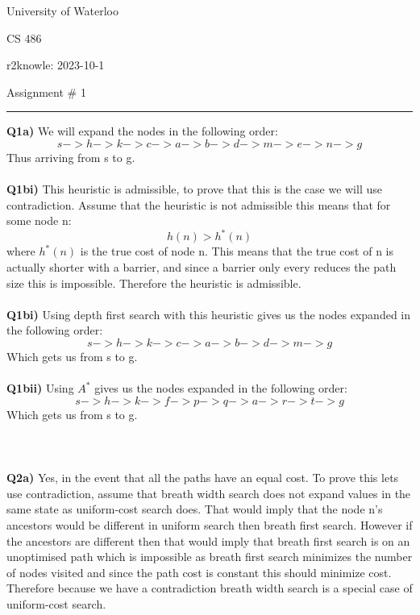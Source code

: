 \documentclass{article}
\begin{document}
\begin{titlepage}
	\setlength{\parindent}{0pt}
	\large

\vspace*{-2cm}


University of Waterloo \par
CS 486 \par
\vspace{0.05cm}
r2knowle: 2023-10-1
\vspace{0.2cm}

{\huge Assignment \# 1 \par}
\hrule

\vspace{0.5cm}
\textbf{Q1a)} We will expand the nodes in the following order:
\[ s -> h -> k -> c -> a -> b -> d -> m -> e -> n -> g \]
Thus arriving from s to g.\\\\
\textbf{Q1bi)} This heuristic is admissible, to prove that this is the case we will use contradiction. Assume that the heuristic is not admissible this means that for some node n:
\[ h(n) > h^*(n) \]
where $h^*(n)$ is the true cost of node n. This means that the true cost of n is actually shorter with a barrier, and since a barrier only every reduces the path size this is impossible. Therefore the heuristic is admissible. \\\\
\textbf{Q1bi)} Using depth first search with this heuristic gives us the nodes expanded in the following order: \\
\[ s -> h -> k -> c -> a -> b -> d -> m -> g \]
Which gets us from s to g. \\\\
\textbf{Q1bii)} Using $A^*$ gives us the nodes expanded in the following order:  \\
\[ s -> h -> k -> f -> p -> q -> a -> r -> t -> g \]
Which gets us from s to g.\\\\\\\\
\textbf{Q2a)} Yes, in the event that all the paths have an equal cost. To prove this lets use contradiction, assume that breath width search does not expand values in the same state as uniform-cost  search does. That would imply that the node n's ancestors would be different in uniform search then breath first search. However if the ancestors are different then that would imply that breath first search is on an unoptimised path which is impossible as breath first search minimizes the number of nodes visited and since the path cost is constant this should minimize cost. Therefore because we have a contradiction breath width search is a special case of uniform-cost search.\\\\

\end{titlepage}
\end{document}
